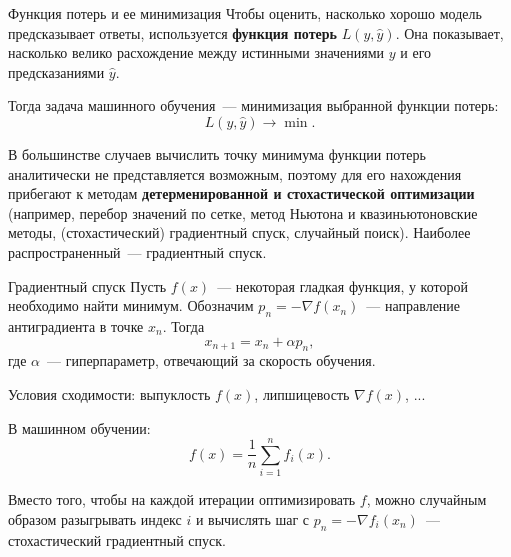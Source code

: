 \documentclass[notheorems, handout]{beamer}
\begin{document}
\begin{frame}{Функция потерь и ее минимизация}
	Чтобы оценить, насколько хорошо модель предсказывает ответы, используется {\bf функция потерь} $L(y, \hat{y})$. Она показывает, насколько велико расхождение между истинными значениями $y$ и его предсказаниями $\hat{y}$.\bigskip

	Тогда задача машинного обучения~--- минимизация выбранной функции потерь:
	\[
	L(y, \hat y)\longrightarrow \min.
	\]\smallskip

	В большинстве случаев вычислить точку минимума функции потерь аналитически не представляется возможным, поэтому для его нахождения прибегают к методам \textbf{детерменированной и стохастической оптимизации} (например, перебор значений по сетке, метод Ньютона и квазиньютоновские методы, (стохастический) градиентный спуск, случайный поиск). Наиболее распространенный~--- градиентный спуск.

\end{frame}

\begin{frame}{Градиентный спуск}
	Пусть $f(x)$~--- некоторая гладкая функция, у которой необходимо найти минимум. Обозначим $p_n=-\nabla f(x_n)$~--- направление антиградиента в точке $x_n$. Тогда
	\[
	x_{n+1}=x_n+\alpha p_n,
	\]
	где $\alpha$~--- гиперпараметр, отвечающий за скорость обучения.\medskip

	Условия сходимости: выпуклость $f(x)$, липшицевость $\nabla f(x)$, ...\medskip

	В машинном обучении:
	\[
	f(x)=\frac{1}{n}\sum_{i=1}^n f_i(x).
	\]

	Вместо того, чтобы на каждой итерации оптимизировать $f$, можно случайным образом разыгрывать индекс $i$ и вычислять шаг с $p_n=-\nabla f _i(x_n)$~--- стохастический градиентный спуск.

\end{frame}
\end{document}
